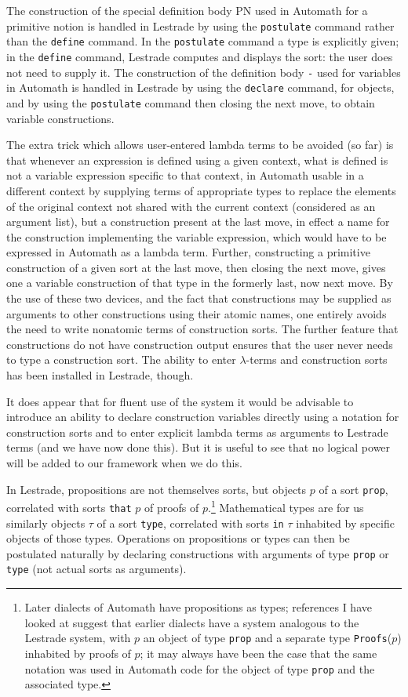 \documentclass[12pt]{article}
\begin{document}
The construction of the special definition body PN used in Automath for a primitive notion is handled in Lestrade by using the {\tt postulate} command rather than the {\tt define} command.  In the {\tt postulate} command a type is explicitly given; in the {\tt define} command, Lestrade computes and displays the sort:  the user does not need to supply it.  The construction of the definition body {\tt -}  used for variables in Automath is handled in Lestrade by using the {\tt declare} command, for objects, and by using the {\tt postulate} command then closing the next move, to obtain variable constructions.

The extra trick which allows user-entered lambda terms to be avoided (so far) is that whenever an expression is defined using a given context, what is defined is not a variable
expression specific to that context, in Automath usable in a different context by supplying terms of appropriate types to replace the elements of the original context not shared with the current context (considered as an argument list), but a construction present at the last move, in effect a name for the construction implementing the variable expression, which would have to be expressed in Automath as a lambda term.  Further, constructing a primitive construction of a given sort at the last move, then closing the next move, gives one a variable
construction of that type in the formerly last, now next move.  By the use of these two devices, and the fact that constructions may be supplied as arguments to other constructions using their atomic names, one entirely avoids the need to write nonatomic terms of construction sorts.  The further feature that constructions do not have construction output ensures that the user never needs to type a construction sort.  The ability to enter $\lambda$-terms and construction sorts has been installed in Lestrade, though.

It does appear that for fluent use of the system it would be advisable to introduce an ability to declare construction variables directly using a notation for construction sorts and to enter explicit lambda terms as arguments to Lestrade terms (and we have now done this).  But it is useful to see that no logical power will be added to our framework when we do this.

In Lestrade, propositions are not themselves sorts, but objects $p$ of a sort {\tt prop}, correlated with sorts {\tt that} $p$ of proofs of $p$.\footnote{Later dialects of Automath have propositions as types; references I have looked at suggest that earlier dialects have a system analogous to the Lestrade system, with $p$ an object of type {\tt prop} and a separate type {\tt Proofs}($p$) inhabited by proofs of $p$; it may always have been the case that the same notation was used in Automath code for the object of type {\tt prop} and the associated type.}  Mathematical types are for us
similarly objects $\tau$ of a sort {\tt type}, correlated with sorts {\tt in} $\tau$ inhabited by specific objects of those types.   Operations on propositions or types can then
be postulated  naturally by declaring constructions with arguments of type {\tt prop} or {\tt type} (not actual sorts as arguments).
\end{document}
